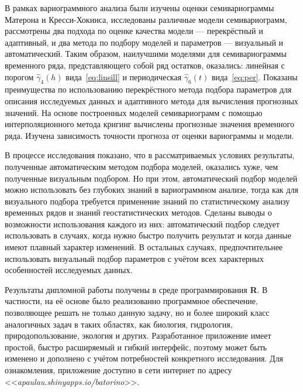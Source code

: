 В рамках вариограммного анализа были изучены оценки семивариограммы Матерона и Кресси-Хокинса, исследованы различные модели семивариограмм, рассмотрены два подхода по оценке качества модели --- перекрёстный и адаптивный, и два метода по подбору моделей и параметров --- визуальный и автоматический. Таким образом, наилучшими моделями для семивариограммы временного ряда, представляющего собой ряд остатков, оказались: линейная с порогом $ \widehat{\gamma}_4(h) $ вида~\eqref{eq:linsill} и периодическая $\widehat{\gamma}_6(t) $ вида~\eqref{eq:per}. Показаны преимущества по использованию перекрёстного метода подбора параметров для описания исследуемых данных и адаптивного метода для вычисления прогнозных значений. На основе построенных моделей семивариограмм с помощью интерполяционного метода кригинг вычислены прогнозные значения временного ряда. Изучена зависимость точности прогноза от оценки вариограммы и модели.

В процессе исследования показано, что в рассматриваемых условиях результаты, полученные автоматическим методом подбора моделей, оказались хуже, чем полученные визуальным подбором. Но при этом, автоматический подбор моделей можно использовать без глубоких знаний в вариограммном анализе, тогда как для визуального подбора требуется применение знаний по статистическому анализу временных рядов и знаний геостатистических методов. Сделаны выводы о возможности использования каждого из них: автоматический подбор следует использовать в случаях, когда нужно быстро получить результат и когда данные имеют плавный характер изменений. В остальных случаях, предпочтительнее использовать визуальный подбор параметров с учётом всех характерных особенностей исследуемых данных.

Результаты дипломной работы получены в среде программирования \textbf{R}. В частности, на её основе было реализованно программное обеспечение, позволяющее решать не только данную задачу, но и более широкий класс аналогичных задач в таких областях, как биология, гидрология, природопользование, экология и других. Разработанное приложение имеет простой, быстро расширяемый и гибкий интерфейс, поэтому может быть изменено и дополнено с учётом потребностей конкретного исследования. Для ознакомления, приложение доступно в сети интернет по адресу <<\textit{apaulau.shinyapps.io/batorino}>>.
